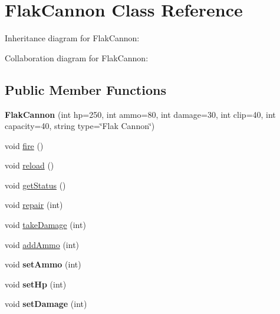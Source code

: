 \hypertarget{classFlakCannon}{}\section{Flak\+Cannon Class Reference}
\label{classFlakCannon}


Inheritance diagram for Flak\+Cannon\+:


Collaboration diagram for Flak\+Cannon\+:
\subsection*{Public Member Functions}
\begin{DoxyCompactItemize}
\item 
\mbox{\label{classFlakCannon_a8b30ac21a1746ea7f100de4df0005cf9}} 
{\bfseries Flak\+Cannon} (int hp=250, int ammo=80, int damage=30, int clip=40, int capacity=40, string type=\char`\"{}Flak Cannon\char`\"{})
\item 
void \hyperlink{classFlakCannon_a0ff19970945d704d45a5f54fed499d68}{fire} ()
\item 
void \hyperlink{classFlakCannon_acfc4f5bc0a9c9a0b079c5a3a8fea67f3}{reload} ()
\item 
void \hyperlink{classFlakCannon_a0dc8a829f7115504f33be168bd5dfa53}{get\+Status} ()
\item 
void \hyperlink{classFlakCannon_a7874f80b4d83c9c2bfc69493d7285eeb}{repair} (int)
\item 
void \hyperlink{classFlakCannon_ae55081dc2801a52421b541e4c42ad415}{take\+Damage} (int)
\item 
void \hyperlink{classFlakCannon_a5aaac2916adb9a2e0364ba1476394780}{add\+Ammo} (int)
\item 
\mbox{\label{classFlakCannon_a694ecdf0ee45fda3e5856f48eacd442e}} 
void {\bfseries set\+Ammo} (int)
\item 
\mbox{\label{classFlakCannon_ae04d4bfc5071ed9d46b3bb12aea7430d}} 
void {\bfseries set\+Hp} (int)
\item 
\mbox{\label{classFlakCannon_a5fced513fbb8ec58228569f7538b6863}} 
void {\bfseries set\+Damage} (int)
\item 
\mbox{\label{classFlakCannon_a7aba95674ba7d6d033ac93a66de64c2a}} 

\end{DoxyCompactItemize}
